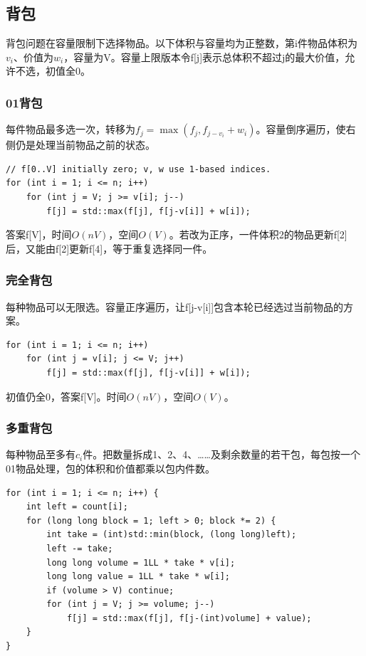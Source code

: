 \documentclass[UTF8,11pt,a4paper,fontset=none]{ctexart}
\begin{document}
\subsection{背包}
背包问题在容量限制下选择物品。以下体积与容量均为正整数，第i件物品体积为$v_i$、价值为$w_i$，容量为V。容量上限版本令f[j]表示总体积不超过j的最大价值，允许不选，初值全0。
\subsubsection{01背包}
每件物品最多选一次，转移为$f_j=\max(f_j,f_{j-v_i}+w_i)$。容量倒序遍历，使右侧仍是处理当前物品之前的状态。
\par\noindent\begin{minipage}{\linewidth}
\begin{lstlisting}
// f[0..V] initially zero; v, w use 1-based indices.
for (int i = 1; i <= n; i++)
    for (int j = V; j >= v[i]; j--)
        f[j] = std::max(f[j], f[j-v[i]] + w[i]);
\end{lstlisting}
\end{minipage}\par
答案f[V]，时间$O(nV)$，空间$O(V)$。若改为正序，一件体积2的物品更新f[2]后，又能由f[2]更新f[4]，等于重复选择同一件。
\subsubsection{完全背包}
每种物品可以无限选。容量正序遍历，让f[j-v[i]]包含本轮已经选过当前物品的方案。
\par\noindent\begin{minipage}{\linewidth}
\begin{lstlisting}
for (int i = 1; i <= n; i++)
    for (int j = v[i]; j <= V; j++)
        f[j] = std::max(f[j], f[j-v[i]] + w[i]);
\end{lstlisting}
\end{minipage}\par
初值仍全0，答案f[V]。时间$O(nV)$，空间$O(V)$。
\subsubsection{多重背包}
每种物品至多有$c_i$件。把数量拆成1、2、4、……及剩余数量的若干包，每包按一个01物品处理，包的体积和价值都乘以包内件数。
\par\noindent\begin{minipage}{\linewidth}
\begin{lstlisting}
for (int i = 1; i <= n; i++) {
    int left = count[i];
    for (long long block = 1; left > 0; block *= 2) {
        int take = (int)std::min(block, (long long)left);
        left -= take;
        long long volume = 1LL * take * v[i];
        long long value = 1LL * take * w[i];
        if (volume > V) continue;
        for (int j = V; j >= volume; j--)
            f[j] = std::max(f[j], f[j-(int)volume] + value);
    }
}
\end{lstlisting}
\end{minipage}\par
\end{document}
